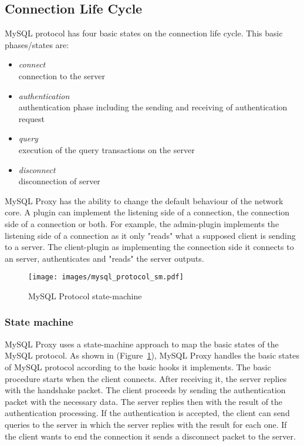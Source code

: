 \subsection{Connection Life Cycle}

MySQL protocol has four basic states on the connection life cycle. This basic phases/states are:

\begin{itemize}
	\item \textit{connect} \\ connection to the server
	\item \textit{authentication} \\ authentication phase including the sending and receiving of authentication request
	\item \textit{query} \\ execution of the query transactions on the server
	\item \textit{disconnect} \\ disconnection of server
\end{itemize}

MySQL Proxy has the ability to change the default behaviour of the network core. A plugin can implement the listening side of a connection, the connection side of a connection or both. For example, the admin-plugin implements the listening side of a connection as it only "reads" what a supposed client is sending to a server. The client-plugin as implementing the connection side it connects to an server, authenticates and "reads" the server outputs.

\begin{figure}[h!]
\centering    
\texttt{[image: images/mysql\_protocol\_sm.pdf]}
\caption{MySQL Protocol state-machine}
\label{fig:protocol_state_machine}
\end{figure}

\subsubsection{State machine}

MySQL Proxy uses a state-machine approach to map the basic states of the MySQL protocol. As shown in (Figure~\ref{fig:protocol_state_machine}), MySQL Proxy handles the basic states of MySQL protocol according to the basic hooks it implements. The basic procedure starts when the client connects. After receiving it, the server replies with the handshake packet. The client proceeds by sending the authentication packet with the necessary data. The server replies then with the result of the authentication processing. If the authentication is accepted, the client can send queries to the server in which the server replies with the result for each one. If the client wants to end the connection it sends a disconnect packet to the server.

